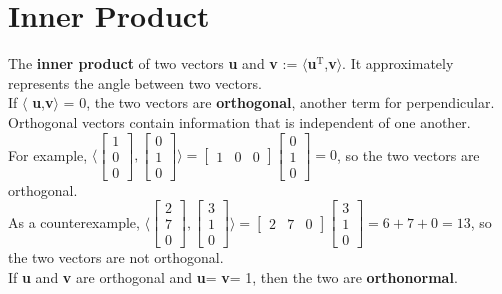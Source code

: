 \documentclass{article}
\theoremstyle{definition}
\begin{document}
\section{Inner Product}
The \textbf{inner product} of two vectors \textbf{u} and \textbf{v} := $\langle$\textbf{u}$^{\text{T}}$,\textbf{v}$\rangle$. It approximately represents the angle between two vectors.\\
\linebreak
If $\langle$ \textbf{u},\textbf{v}$\rangle$ = 0, the two vectors are \textbf{orthogonal}, another term for perpendicular. Orthogonal vectors contain information that is independent of one another.\\
\linebreak
For example, $\langle $$\begin{bmatrix}1\\0\\0\end{bmatrix} , \begin{bmatrix}0\\1\\0\end{bmatrix}$$ \rangle = $$\begin{bmatrix}1&0&0\end{bmatrix} \begin{bmatrix} 0\\1\\0\end{bmatrix}$$ = 0$, so the two vectors are orthogonal. \\
\linebreak
As a counterexample, $\langle $$\begin{bmatrix}2\\7\\0\end{bmatrix} , \begin{bmatrix}3\\1\\0\end{bmatrix}$$ \rangle = $$\begin{bmatrix}2&7& 0\end{bmatrix} \begin{bmatrix} 3\\1\\0\end{bmatrix}$$ = 6 + 7 + 0 = 13$, so the two vectors are not orthogonal.\\
\linebreak
If \textbf{u} and \textbf{v} are orthogonal and \textbar\textbar\textbf{u}\textbar\textbar = \textbar\textbar\textbf{v}\textbar\textbar = 1, then the two are \textbf{orthonormal}.
\end{document}

